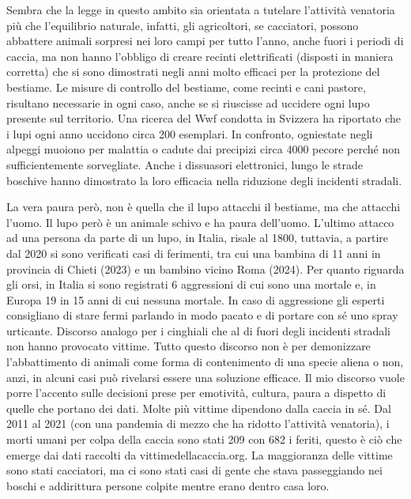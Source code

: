 \documentclass[12pt]{book} %
\begin{document}
\begin{mdframed}[linewidth=1pt]
Sembra che la legge in questo ambito sia orientata a tutelare l'attività venatoria più che l'equilibrio naturale, infatti, gli agricoltori, se cacciatori, possono abbattere animali sorpresi nei loro campi per tutto l'anno, anche fuori i periodi di caccia, ma non hanno l'obbligo di creare recinti elettrificati (disposti in maniera corretta) che si sono dimostrati negli anni molto efficaci per la protezione del bestiame. Le misure di controllo del bestiame, come recinti e cani pastore, risultano necessarie in ogni caso, anche se si riuscisse ad uccidere ogni lupo presente sul territorio. Una ricerca del Wwf condotta in Svizzera ha riportato che i lupi ogni anno uccidono circa 200 esemplari. In confronto, ogniestate negli alpeggi muoiono per malattia o cadute dai precipizi circa 4000 pecore perché non sufficientemente sorvegliate. Anche i dissuasori elettronici, lungo le strade boschive hanno dimostrato la loro efficacia nella riduzione degli incidenti stradali.

La vera paura però, non è quella che il lupo attacchi il bestiame, ma che attacchi l'uomo. Il lupo però è un animale schivo e ha paura dell'uomo. L'ultimo attacco ad una persona da parte di un lupo, in Italia, risale al 1800, tuttavia, a partire dal 2020 si sono verificati casi di ferimenti, tra cui una bambina di 11 anni in provincia di Chieti (2023) e un bambino vicino Roma (2024).
Per quanto riguarda gli orsi, in Italia si sono registrati 6 aggressioni di cui sono una mortale e, in Europa 19 in 15 anni di cui nessuna mortale. In caso di aggressione gli esperti consigliano di stare fermi parlando in modo pacato e di portare con sé uno spray urticante. Discorso analogo per i cinghiali che al di fuori degli incidenti stradali non hanno provocato vittime.
Tutto questo discorso non è per demonizzare l'abbattimento di animali come forma di contenimento di una specie aliena o non, anzi, in alcuni casi può rivelarsi essere una soluzione efficace. Il mio discorso vuole porre l'accento sulle decisioni prese per emotività, cultura, paura a dispetto di quelle che portano dei dati.
Molte più vittime dipendono dalla caccia in sé. Dal 2011 al 2021
(con una pandemia di mezzo che ha ridotto l'attività venatoria), i morti umani per colpa della caccia sono stati 209 con 682 i feriti, questo è ciò che emerge dai dati raccolti da vittimedellacaccia.org. La maggioranza delle vittime sono stati cacciatori, ma ci sono stati casi di gente che stava passeggiando nei boschi e
addirittura persone colpite mentre erano dentro casa loro. 
\end{mdframed}
\end{document}
